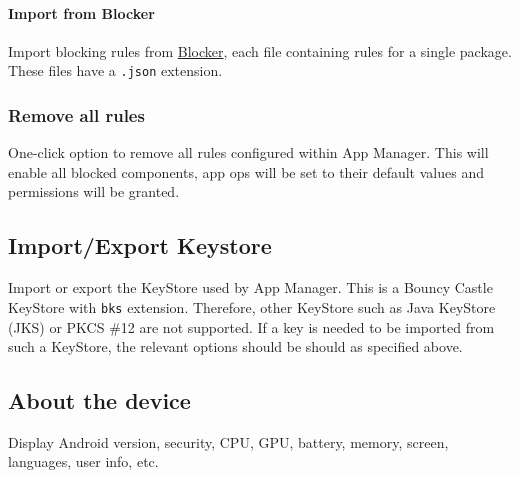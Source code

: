 \paragraph{Import from Blocker} Import blocking rules from \href{https://github.com/lihenggui/blocker}{Blocker}, each file containing rules for a single package.
These files have a \texttt{.json} extension.

\subsubsection{Remove all rules} %
One-click option to remove all rules configured within App Manager.
This will enable all blocked components, app ops will be set to their default values and permissions will be granted.

\subsection{Import/Export Keystore}\label{subsec:import/export-keystore} %
Import or export the KeyStore used by App Manager. This is a Bouncy Castle KeyStore with \texttt{bks} extension.
Therefore, other KeyStore such as Java KeyStore (JKS) or PKCS \#12 are not supported.
If a key is needed to be imported from such a KeyStore, the relevant options should be should as specified above.

\subsection{About the device}\label{subsec:device-info} %
Display Android version, security, CPU, GPU, battery, memory, screen, languages, user info, etc.
